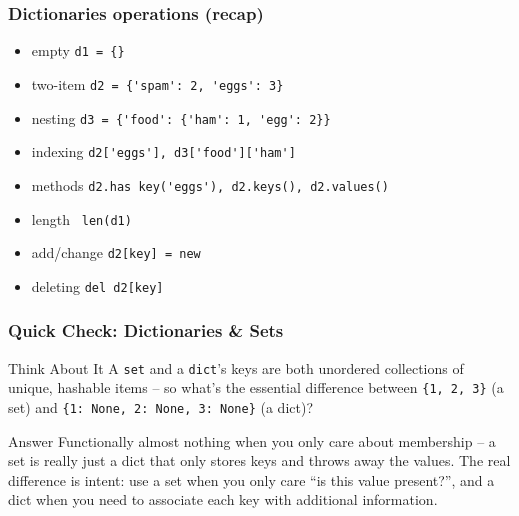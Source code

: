 \begin{frame}[fragile]\frametitle{Dictionaries operations (recap)}
  \begin{itemize}
  \item empty  \lstinline|d1 = {}|
  \item two-item \lstinline|d2 = {'spam': 2, 'eggs': 3}|
  \item nesting \lstinline|d3 = {'food': {'ham': 1, 'egg': 2}}|
  \item indexing \lstinline|d2['eggs'], d3['food']['ham']|
  \item methods \lstinline|d2.has key('eggs'), d2.keys(), d2.values()|
  \item length \lstinline| len(d1)|
  \item add/change \lstinline|d2[key] = new|
  \item deleting \lstinline|del d2[key]|
  \end{itemize}
\end{frame}

\begin{frame}[fragile]\frametitle{Quick Check: Dictionaries \& Sets}
\begin{block}{Think About It}
A \texttt{set} and a \texttt{dict}'s keys are both unordered collections of unique, hashable items -- so what's the essential difference between \texttt{\{1, 2, 3\}} (a set) and \texttt{\{1: None, 2: None, 3: None\}} (a dict)?
\end{block}
\pause
\begin{block}{Answer}
Functionally almost nothing when you only care about membership -- a set is really just a dict that only stores keys and throws away the values. The real difference is intent: use a set when you only care ``is this value present?'', and a dict when you need to associate each key with additional information.
\end{block}
\end{frame}